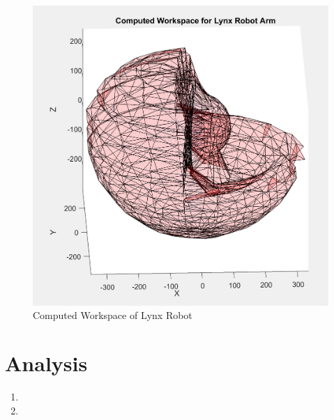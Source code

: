\documentclass[12pt]{article}
\begin{document}
\begin{enumerate}
\begin{figure}
	\includegraphics[scale=.5]{ComputedWorkspace.png}
	\caption{Computed Workspace of Lynx Robot}
	\end{figure}

\end{enumerate}

\section{Analysis}
\begin{enumerate}
\item
\item
\end{enumerate}
\end{document}

